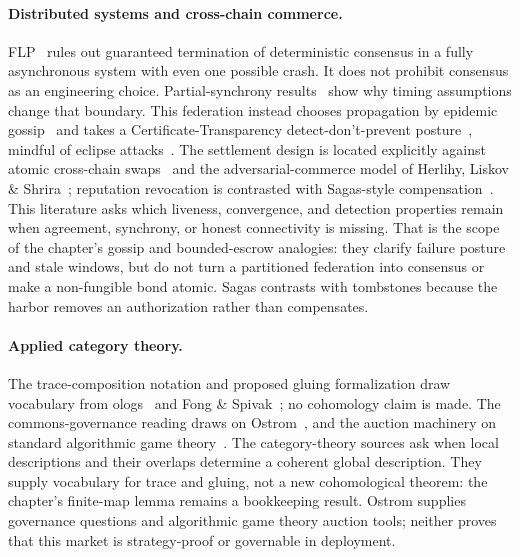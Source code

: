 \documentclass[11pt,a4paper]{article}
\theoremstyle{definition}
\theoremstyle{definition}
\theoremstyle{remark}
\begin{document}
\paragraph{Distributed systems and cross-chain commerce.} FLP~
rules out guaranteed termination of deterministic consensus in a fully
asynchronous system with even one possible crash. It does not prohibit
consensus as an engineering choice. Partial-synchrony results~
show why timing assumptions change that boundary. This federation instead
chooses propagation by epidemic gossip~ and takes
a Certificate-Transparency detect-don't-prevent posture~,
mindful of eclipse attacks~. The settlement design is located
explicitly against atomic cross-chain swaps~ and the
adversarial-commerce model of Herlihy, Liskov \& Shrira~; reputation
revocation is contrasted with Sagas-style compensation~.
This literature asks which liveness, convergence, and detection properties
remain when agreement, synchrony, or honest connectivity is missing. That is
the scope of the chapter's gossip and bounded-escrow analogies: they clarify
failure posture and stale windows, but do not turn a partitioned federation
into consensus or make a non-fungible bond atomic. Sagas contrasts with
tombstones because the harbor removes an authorization rather than compensates.

\paragraph{Applied category theory.} The trace-composition notation and proposed
gluing formalization draw vocabulary from ologs~ and Fong \&
Spivak~; no cohomology claim is made. The commons-governance reading draws on
Ostrom~, and the auction machinery on standard algorithmic game
theory~.
The category-theory sources ask when local descriptions and their overlaps
determine a coherent global description. They supply vocabulary for trace and
gluing, not a new cohomological theorem: the chapter's finite-map lemma remains
a bookkeeping result. Ostrom supplies governance questions and algorithmic
game theory auction tools; neither proves that this market is strategy-proof or
governable in deployment.
\end{document}
